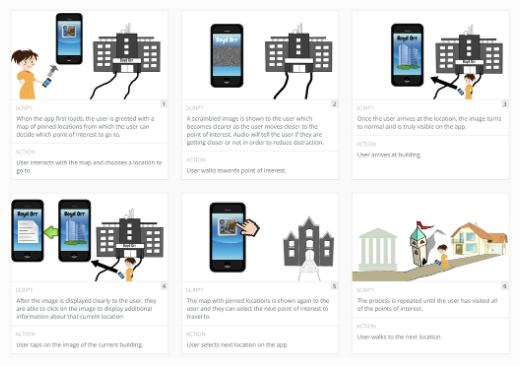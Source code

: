 \documentclass[a4,10pt,twocolumn]{article}
\begin{document}
\noindent\includegraphics[width=\columnwidth]{storyboard3.png}
\end{document}
